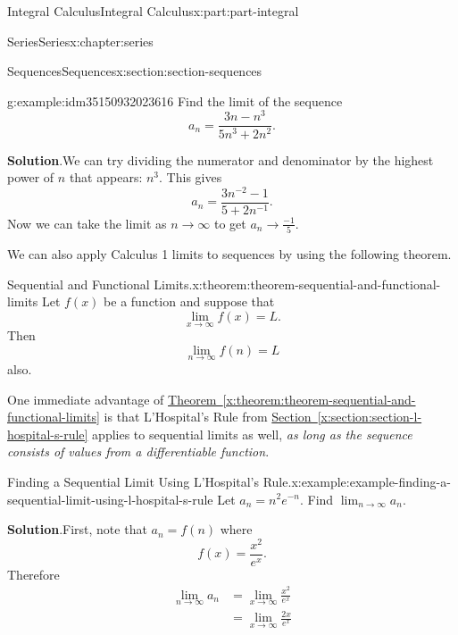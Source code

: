 \documentclass[twoside,10pt,]{book}
\newcommand{\blocktitlefont}{\relax}
\newcommand{\xreffont}{\relax}
\numberwithin{equation}{part}
\newcommand{\amp}{&}
\begin{document}
\begin{partptx}{Integral Calculus}{}{Integral Calculus}{}{}{x:part:part-integral}
\begin{chapterptx}{Series}{}{Series}{}{}{x:chapter:series}
\begin{sectionptx}{Sequences}{}{Sequences}{}{}{x:section:section-sequences}
\begin{example}{}{g:example:idm35150932023616}
Find the limit of the sequence%
\begin{equation*}
a_{n} = \frac{3n - n^{3}}{5n^{3} + 2n^{2}}.
\end{equation*}
%
\par\smallskip%
\noindent\textbf{\blocktitlefont Solution}.\hypertarget{g:solution:idm35150932022720}{}\quad{}We can try dividing the numerator and denominator by the highest power of \(n\) that appears: \(n^{3}\). This gives%
\begin{equation*}
a_{n} = \frac{3n^{-2} - 1}{5 + 2n^{-1}}\text{.}
\end{equation*}
Now we can take the limit as \(n\to\infty\) to get \(a_{n}\to\frac{-1}{5}\).%
\end{example}
We can also apply Calculus 1 limits to sequences by using the following theorem.%
\begin{theorem}{Sequential and Functional Limits.}{}{x:theorem:theorem-sequential-and-functional-limits}%
Let \(f(x)\) be a function and suppose that%
\begin{equation*}
\lim_{x\to\infty}f(x) = L\text{.}
\end{equation*}
Then%
\begin{equation*}
\lim_{n\to\infty}f(n) = L
\end{equation*}
also.%
\end{theorem}
One immediate advantage of \hyperref[x:theorem:theorem-sequential-and-functional-limits]{Theorem~{\xreffont\ref{x:theorem:theorem-sequential-and-functional-limits}}} is that L'Hospital's Rule from \hyperref[x:section:section-l-hospital-s-rule]{Section~{\xreffont\ref{x:section:section-l-hospital-s-rule}}} applies to sequential limits as well, \emph{as long as the sequence consists of values from a differentiable function}.%
\begin{example}{Finding a Sequential Limit Using L'Hospital's Rule.}{x:example:example-finding-a-sequential-limit-using-l-hospital-s-rule}%
Let \(a_{n} = n^{2}e^{-n}\). Find \(\lim_{n\to\infty}a_{n}\).%
\par\smallskip%
\noindent\textbf{\blocktitlefont Solution}.\hypertarget{g:solution:idm35150932080064}{}\quad{}First, note that \(a_{n} = f(n)\) where%
\begin{equation*}
f(x) = \frac{x^{2}}{e^{x}}\text{.}
\end{equation*}
Therefore%
%
\begin{align*}
\lim_{n\to\infty}a_{n} \amp = \lim_{x\to\infty}\frac{x^{2}}{e^{x}} \\
\amp = \lim_{x\to\infty}\frac{2x}{e^{x}} \\

\end{align*}
\end{example}
\end{sectionptx}
\end{chapterptx}
\end{partptx}
\end{document}
